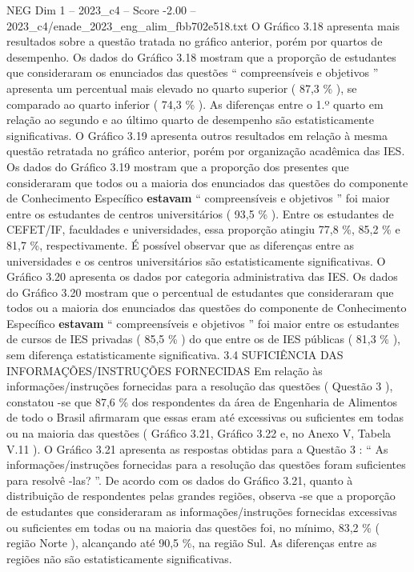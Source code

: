 \begin{textsample}{NEG Dim 1 – 2023\_c4 – Score -2.00 – 2023\_c4/enade\_2023\_eng\_alim\_fbb702e518.txt}
O Gráfico 3.18 apresenta mais resultados sobre a questão tratada no gráfico anterior, porém por quartos de desempenho.
Os dados do Gráfico 3.18 mostram que a proporção de estudantes que consideraram os enunciados das questões “ compreensíveis e objetivos ” apresenta um percentual mais elevado no quarto superior ( 87,3 \% ), se comparado ao quarto inferior ( 74,3 \% ).
As diferenças entre o 1.º quarto em relação ao segundo e ao último quarto de desempenho são estatisticamente significativas.
O Gráfico 3.19 apresenta outros resultados em relação à mesma questão retratada no gráfico anterior, porém por organização acadêmica das IES.
Os dados do Gráfico 3.19 mostram que a proporção dos presentes que consideraram que todos ou a maioria dos enunciados das questões do componente de Conhecimento Específico \textbf{estavam} “ compreensíveis e objetivos ” foi maior entre os estudantes de centros universitários ( 93,5 \% ).
Entre os estudantes de CEFET/IF, faculdades e universidades, essa proporção atingiu 77,8 \%, 85,2 \% e 81,7 \%, respectivamente.
É possível observar que as diferenças entre as universidades e os centros universitários são estatisticamente significativas.
O Gráfico 3.20 apresenta os dados por categoria administrativa das IES.
Os dados do Gráfico 3.20 mostram que o percentual de estudantes que consideraram que todos ou a maioria dos enunciados das questões do componente de Conhecimento Específico \textbf{estavam} “ compreensíveis e objetivos ” foi maior entre os estudantes de cursos de IES privadas ( 85,5 \% ) do que entre os de IES públicas ( 81,3 \% ), sem diferença estatisticamente significativa. 3.4 SUFICIÊNCIA DAS INFORMAÇÕES/INSTRUÇÕES FORNECIDAS Em relação às informações/instruções fornecidas para a resolução das questões ( Questão 3 ), constatou -se que 87,6 \% dos respondentes da área de Engenharia de Alimentos de todo o Brasil afirmaram que essas eram até excessivas ou suficientes em todas ou na maioria das questões ( Gráfico 3.21, Gráfico 3.22 e, no Anexo V, Tabela V.11 ).
O Gráfico 3.21 apresenta as respostas obtidas para a Questão 3 : “ As informações/instruções fornecidas para a resolução das questões foram suficientes para resolvê -las? ”.
De acordo com os dados do Gráfico 3.21, quanto à distribuição de respondentes pelas grandes regiões, observa -se que a proporção de estudantes que consideraram as informações/instruções fornecidas excessivas ou suficientes em todas ou na maioria das questões foi, no mínimo, 83,2 \% ( região Norte ), alcançando até 90,5 \%, na região Sul.
As diferenças entre as regiões não são estatisticamente significativas.

\end{textsample}
